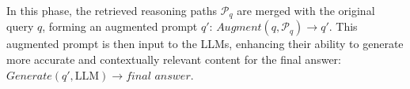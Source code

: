 \begin{definition}
	\label{def:generation}
In this phase, the retrieved reasoning paths $\mathcal{P}_q$ are merged with the original query $q$, forming an augmented prompt $q'$: $\textit{Augment}(q, \mathcal{P}_{q}) \rightarrow q'$.
This augmented prompt is then input to the LLMs, enhancing their ability to generate more accurate and contextually relevant content for the final answer: $	\textit{Generate}(q', \text{LLM}) \rightarrow \textit{final answer}$.
\end{definition}

